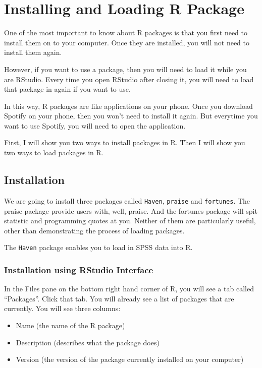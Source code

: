 \documentclass[
]{book}
\providecommand{\tightlist}{%
  \setlength{\itemsep}{0pt}\setlength{\parskip}{0pt}}
\begin{document}
\hypertarget{installing-and-loading-r-package}{%
\section{Installing and Loading R Package}\label{installing-and-loading-r-package}}

One of the most important to know about R packages is that you first need to install them on to your computer. Once they are installed, you will not need to install them again.

However, if you want to use a package, then you will need to load it while you are RStudio. Every time you open RStudio after closing it, you will need to load that package in again if you want to use.

In this way, R packages are like applications on your phone. Once you download Spotify on your phone, then you won't need to install it again. But everytime you want to use Spotify, you will need to open the application.

First, I will show you two ways to install packages in R. Then I will show you two ways to load packages in R.

\hypertarget{installation}{%
\subsection{Installation}\label{installation}}

We are going to install three packages called \texttt{Haven}, \texttt{praise} and \texttt{fortunes}. The praise package provide users with, well, praise. And the fortunes package will spit statistic and programming quotes at you. Neither of them are particularly useful, other than demonstrating the process of loading packages.

The \texttt{Haven} package enables you to load in SPSS data into R.

\hypertarget{installation-using-rstudio-interface}{%
\subsubsection{Installation using RStudio Interface}\label{installation-using-rstudio-interface}}

In the Files pane on the bottom right hand corner of R, you will see a tab called ``Packages''. Click that tab. You will already see a list of packages that are currently. You will see three columns:

\begin{itemize}
\tightlist
\item
  Name (the name of the R package)
\item
  Description (describes what the package does)
\item
  Version (the version of the package currently installed on your computer)
\end{itemize}
\end{document}

